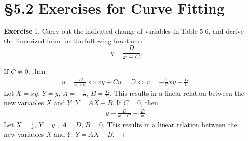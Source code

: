 \documentclass[UTF8,12pt,hyperref]{ctexart}
\makeatletter
\newenvironment{exercise}[1][{\color{blue}\bf Exercise}]%
{%
 \begin{center}   \begin{lrbox}{\@tempboxa}%
    \begin{minipage}{\textwidth}%
  {\color{blue}\bfseries
#1}   }{%
    \end{minipage}%
    \end{lrbox}
    \colorbox{green}{\noindent\usebox{\@tempboxa}} \end{center}  
}
\newenvironment{solve}[1][\color{blue}\bf Solve]{\begin{trivlist}
\item[\hskip \labelsep {\color{blue}\bfseries
#1}]}{\hfill$\Box$\end{trivlist}}
\makeatother
\begin{document}

\section*{\S  5.2 Exercises for Curve Fitting}
  
\begin{exercise}1.\qquad
Carry out the indicated change of variables in Table 5.6, and derive the Iinearized form for the following functions:
$$
\displaystyle y=\dfrac{D}{x+C}.
$$
\end{exercise} 

\begin{solve}
  If $C\neq 0$, then 
  \begin{align*}
    y=\frac{D}{x+C} \Leftrightarrow xy+Cy=D \Leftrightarrow y=-\frac{1}{C}xy + \frac{D}{C}.
  \end{align*}
  Let $X=xy$, $Y=y$, $A=-\frac{1}{C}$, $B=\frac{D}{C}$. This results in a linear relation between the new variables $X$ and $Y$:
    $Y=AX+B$. 
  If $C=0$, then
  \begin{align*}
    y=\frac{D}{x+C}=\frac{D}{x}.
  \end{align*}
  Let $X=\frac{1}{x}$, $Y=y$ , $A=D$, $B=0$. This results in a linear relation between the new variables $X$ and $Y$:
    $Y=AX+B$.
\end{solve}
\end{document}
